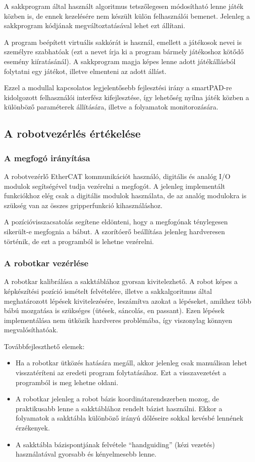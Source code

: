 \documentclass[../documentation.tex]{subfiles}
\begin{document}
A sakkprogram által használt algoritmus tetszőlegesen módosítható lenne játék közben is, de ennek kezelésére nem készült külön felhasználói bemenet. Jelenleg a sakkprogram kódjának megváltoztatásával lehet ezt állítani.

A program beépített virtuális sakkórát is használ, emellett a játékosok nevei is személyre szabhatóak (ezt a nevet írja ki a program bármely játékoshoz kötődő esemény kiíratásánál). A sakkprogram magja képes lenne adott játékállásból folytatni egy játékot, illetve elmenteni az adott állást.

Ezzel a modullal kapcsolatos legjelentősebb fejlesztési irány a smartPAD-re kidolgozott felhasználói interfész kifejlesztése, így lehetőség nyílna játék közben a különböző paraméterek állítására, illetve a folyamatok monitorozására.

\subsection{A robotvezérlés értékelése}
\subsubsection{A megfogó irányítása}
A robotvezérlő EtherCAT kommunikációt használó, digitális és analóg I/O modulok segítségével tudja vezérelni a megfogót. A jelenleg implementált funkciókhoz elég csak a digitális modulok használata, de az analóg modulokra is szükség van az összes gripperfunkció kihasználáshoz.

A pozícióvisszacsatolás segítene eldönteni, hogy a megfogónak ténylegesen sikerült-e megfognia a bábut. A szorítóerő beállítása jelenleg hardveresen történik, de ezt a programból is lehetne vezérelni.

\subsubsection{A robotkar vezérlése}
A robotkar kalibrálása a sakktáblához gyorsan kivitelezhető. A robot képes a képkészítési pozíció ismételt felvételére, illetve a sakkalgoritmus által meghatározott lépések kivitelezésére, leszámítva azokat a lépéseket, amikhez több bábú mozgatása is szükséges (ütések, sáncolás, en passant). Ezen lépések implementálása nem ütközik hardveres problémába, így viszonylag könnyen megvalósíthatóak.

Továbbfejleszthető elemek:
\begin{itemize}
	\item Ha a robotkar ütközés hatására megáll, akkor jelenleg csak manuálisan lehet visszatéríteni az eredeti program folytatásához. Ezt a visszavezetést a programból is meg lehetne oldani.
	\item A robotkar jelenleg a robot bázis koordinátarendszerben mozog, de praktikusabb lenne a sakktáblához rendelt bázist használni. Ekkor a folyamatok a sakktábla különböző irányú dőléseire sokkal kevésbé lennének érzékenyek.
	\item A sakktábla bázispontjának felvétele ``handguiding'' (kézi vezetés) használatával gyorsabb és kényelmesebb lenne.
\end{itemize}
\end{document}
